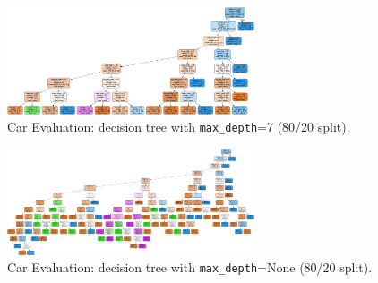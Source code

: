 \begin{figure}[H]
	\centering
	\includegraphics[width=0.65\textwidth]{imgs/dt-mini/dt__car_evaluation__80_vs_20__7.png}
	\caption{Car Evaluation: decision tree with \texttt{max\_depth}=7 (80/20 split).}\label{fig:ce-dt-depth-7}
\end{figure}

\begin{figure}[H]
	\centering
	\includegraphics[width=0.65\textwidth]{imgs/dt-mini/dt__car_evaluation__80_vs_20__None.png}
	\caption{Car Evaluation: decision tree with \texttt{max\_depth}=None (80/20 split).}\label{fig:ce-dt-depth-none}
\end{figure}

